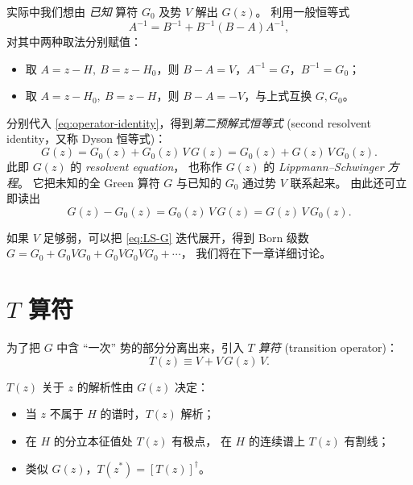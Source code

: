 实际中我们想由 \emph{已知} 算符 $G_0$ 及势 $V$ 解出 $G(z)$。
利用一般恒等式
\begin{equation}\label{eq:operator-identity}
  A^{-1} = B^{-1} + B^{-1}(B-A)A^{-1},
\end{equation}
对其中两种取法分别赋值：
\begin{itemize}
  \item 取 $A=z-H,\ B=z-H_0$，则 $B-A=V$，$A^{-1}=G$，$B^{-1}=G_0$；
  \item 取 $A=z-H_0,\ B=z-H$，则 $B-A=-V$，与上式互换 $G,G_0$。
\end{itemize}
分别代入 \eqref{eq:operator-identity}，得到\emph{第二预解式恒等式}
(second resolvent identity，又称 Dyson 恒等式)：
\begin{equation}\label{eq:LS-G}
  \boxed{\,G(z) = G_0(z) + G_0(z)\,V\,G(z)
                 = G_0(z) + G(z)\,V\,G_0(z).\,}
\end{equation}
此即 $G(z)$ 的 \emph{resolvent equation}，
也称作 $G(z)$ 的 \emph{Lippmann--Schwinger 方程}。
它把未知的全 Green 算符 $G$ 与已知的 $G_0$ 通过势 $V$ 联系起来。
由此还可立即读出
\begin{equation}\label{eq:G-minus-G0}
  G(z) - G_0(z) = G_0(z)\,V\,G(z) = G(z)\,V\,G_0(z).
\end{equation}

如果 $V$ 足够弱，可以把 \eqref{eq:LS-G} 迭代展开，得到 Born 级数
$G = G_0 + G_0 V G_0 + G_0 V G_0 V G_0 + \cdots$，
我们将在下一章详细讨论。

\section{$T$ 算符}\label{sec:Tmat}

为了把 $G$ 中含 ``一次'' 势的部分分离出来，引入 \emph{$T$ 算符}
(transition operator)：
\begin{equation}\label{eq:T-def}
  T(z) \equiv V + V\,G(z)\,V.
\end{equation}

\begin{proposition}[$T$ 算符的解析性]
$T(z)$ 关于 $z$ 的解析性由 $G(z)$ 决定：
\begin{itemize}
  \item 当 $z$ 不属于 $H$ 的谱时，$T(z)$ 解析；
  \item 在 $H$ 的分立本征值处 $T(z)$ 有极点，
        在 $H$ 的连续谱上 $T(z)$ 有割线；
  \item 类似 $G(z)$，$T(z^*)=[T(z)]^\dagger$。
\end{itemize}
\end{proposition}

